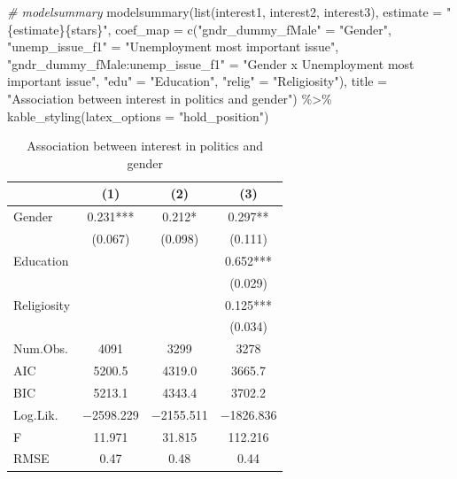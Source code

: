 \documentclass[
]{article}
\newenvironment{Shaded}{\begin{snugshade}}{\end{snugshade}}
\newcommand{\AttributeTok}[1]{\textcolor[rgb]{0.77,0.63,0.00}{#1}}
\newcommand{\CommentTok}[1]{\textcolor[rgb]{0.56,0.35,0.01}{\textit{#1}}}
\newcommand{\FunctionTok}[1]{\textcolor[rgb]{0.00,0.00,0.00}{#1}}
\newcommand{\NormalTok}[1]{#1}
\newcommand{\OtherTok}[1]{\textcolor[rgb]{0.56,0.35,0.01}{#1}}
\newcommand{\SpecialCharTok}[1]{\textcolor[rgb]{0.00,0.00,0.00}{#1}}
\newcommand{\StringTok}[1]{\textcolor[rgb]{0.31,0.60,0.02}{#1}}
\begin{document}
\begin{Shaded}
\begin{Highlighting}[]
\CommentTok{\# modelsummary }
\FunctionTok{modelsummary}\NormalTok{(}\FunctionTok{list}\NormalTok{(interest1, interest2, interest3), }
             \AttributeTok{estimate =} \StringTok{"\{estimate\}\{stars\}"}\NormalTok{,}
             \AttributeTok{coef\_map =} \FunctionTok{c}\NormalTok{(}\StringTok{"gndr\_dummy\_fMale"} \OtherTok{=} \StringTok{"Gender"}\NormalTok{, }
                          \StringTok{"unemp\_issue\_f1"} \OtherTok{=} \StringTok{"Unemployment most important issue"}\NormalTok{, }
                          \StringTok{"gndr\_dummy\_fMale:unemp\_issue\_f1"} \OtherTok{=} \StringTok{"Gender x Unemployment most important issue"}\NormalTok{,}
                          \StringTok{"edu"} \OtherTok{=} \StringTok{"Education"}\NormalTok{, }
                          \StringTok{"relig"} \OtherTok{=} \StringTok{"Religiosity"}\NormalTok{), }
             \AttributeTok{title =} \StringTok{"Association between interest in politics and gender"}\NormalTok{) }\SpecialCharTok{\%\textgreater{}\%}
  \FunctionTok{kable\_styling}\NormalTok{(}\AttributeTok{latex\_options =} \StringTok{"hold\_position"}\NormalTok{)}
\end{Highlighting}
\end{Shaded}

\begin{table}[!h]

\caption{\label{tab:gender-interest-relation}Association between interest in politics and gender}
\centering
\begin{tabular}[t]{lccc}
\toprule
  & (1) & (2) & (3)\\
\midrule
Gender & \num{0.231}*** & \num{0.212}* & \num{0.297}**\\
 & (\num{0.067}) & (\num{0.098}) & (\num{0.111})\\
Education &  &  & \num{0.652}***\\
 &  &  & (\num{0.029})\\
Religiosity &  &  & \num{0.125}***\\
 &  &  & (\num{0.034})\\
\midrule
Num.Obs. & \num{4091} & \num{3299} & \num{3278}\\
AIC & \num{5200.5} & \num{4319.0} & \num{3665.7}\\
BIC & \num{5213.1} & \num{4343.4} & \num{3702.2}\\
Log.Lik. & \num{-2598.229} & \num{-2155.511} & \num{-1826.836}\\
F & \num{11.971} & \num{31.815} & \num{112.216}\\
RMSE & \num{0.47} & \num{0.48} & \num{0.44}\\
\bottomrule
\end{tabular}
\end{table}
\end{document}
